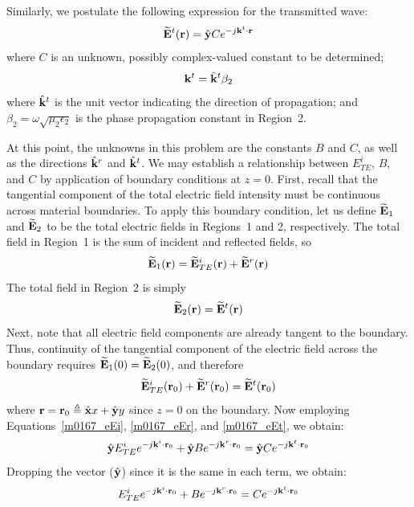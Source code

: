 Similarly, we postulate the following expression for the transmitted wave:
%
\begin{equation}
\widetilde{\bf E}^t({\bf r}) = \hat{\bf y} C e^{-j{\bf k}^t\cdot{\bf r}}
\label{m0167_eEt}
\end{equation}
%
where $C$ is an unknown, possibly complex-valued constant to be determined;
%
\begin{equation}
{\bf k}^t = \hat{\bf k}^t \beta_2
\end{equation}
%
where
$\hat{\bf k}^t$ is the unit vector indicating the direction of propagation; and
$\beta_2=\omega\sqrt{\mu_2 \epsilon_2}$ is the phase propagation constant in Region~2.

At this point, the unknowns in this problem are the constants $B$ and $C$, as well as the directions $\hat{\bf k}^r$ and $\hat{\bf k}^t$.  
We may establish a relationship between $E^i_{TE}$, $B$, and $C$ by application of boundary conditions at $z=0$.  
First, recall that the tangential component of the total electric field intensity must be continuous across material boundaries.
To apply this boundary condition, let us define $\widetilde{\bf E}_1$ and $\widetilde{\bf E}_2$ to be the total electric fields in Regions~1 and 2, respectively.
The total field in Region~1 is the sum of incident and reflected fields, so
%
\begin{equation}
\widetilde{\bf E}_1({\bf r}) = \widetilde{\bf E}^i_{TE}({\bf r}) + \widetilde{\bf E}^r({\bf r})
\end{equation}
%
The total field in Region~2 is simply
%
\begin{equation}
\widetilde{\bf E}_2({\bf r}) = \widetilde{\bf E}^t({\bf r})
\end{equation}
%
Next, note that all electric field components are already tangent to the boundary.
Thus, continuity of the tangential component of the electric field across the boundary requires $\widetilde{\bf E}_1(0)=\widetilde{\bf E}_2(0)$, and therefore
%
\begin{equation}
\widetilde{\bf E}^i_{TE}({\bf r}_0) + \widetilde{\bf E}^r({\bf r}_0)  = \widetilde{\bf E}^t({\bf r}_0) 
\end{equation}
%
where ${\bf r}={\bf r}_0\triangleq\hat{\bf x}x+\hat{\bf y}y$ since $z=0$ on the boundary.
Now employing Equations~\ref{m0167_eEi}, \ref{m0167_eEr}, and \ref{m0167_eEt}, we obtain:
%
\begin{equation}
\hat{\bf y}E^i_{TE}e^{-j{\bf k}^i\cdot{\bf r}_0} + 
\hat{\bf y}B         e^{-j{\bf k}^r\cdot{\bf r}_0} = 
\hat{\bf y}C         e^{-j{\bf k}^t\cdot{\bf r}_0}
\label{m0167_eBCE}
\end{equation}
%
Dropping the vector ($\hat{\bf y}$) since it is the same in each term, we obtain:
%
\begin{equation}
E^i_{TE}e^{-j{\bf k}^i\cdot{\bf r}_0} + 
B         e^{-j{\bf k}^r\cdot{\bf r}_0} = 
C         e^{-j{\bf k}^t\cdot{\bf r}_0}
\label{m0167_eBCE2}
\end{equation}

